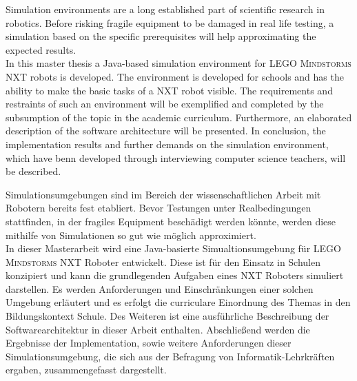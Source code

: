 \documentclass[paper=a4, DIV=calc, BCOR=12mm, twoside=on, onecolumn=on, open = right, titlepage =on, parskip =half-, headsepline = on, footsepline = off, chapterprefix = off, appendixprefix = on, fontsize = 12pt, numbers = noenddot, abstract = on]{scrbook}
\begin{document}
\newpage
\thispagestyle{plain}




\thispagestyle{empty}
\newpage
\thispagestyle{empty}

\onehalfspacing
Simulation environments are a long established part of scientific research in robotics. Before risking fragile equipment to be damaged in real life testing, a simulation based on the specific prerequisites will help approximating the expected results.\\
In this master thesis a Java-based simulation environment for \textsc{LEGO Mindstorms} NXT robots is developed. The environment is developed for schools and has the ability to make the basic tasks of a NXT robot visible. The requirements and restraints of such an environment will be exemplified and completed by the subsumption of the topic in the academic curriculum. Furthermore, an elaborated description of the software architecture will be presented. In conclusion, the implementation results and further demands on the simulation environment, which have benn developed through interviewing computer science teachers, will be described.

\onehalfspacing
Simulationsumgebungen sind im Bereich der wissenschaftlichen Arbeit mit Robotern bereits fest etabliert. Bevor Testungen unter Realbedingungen stattfinden, in der fragiles Equipment beschädigt werden könnte, werden diese mithilfe von Simulationen so gut wie möglich approximiert.\\
In dieser Masterarbeit wird eine Java-basierte Simualtionsumgebung für \textsc{LEGO Mindstorms} NXT Roboter entwickelt. Diese ist für den Einsatz in Schulen konzipiert und kann die grundlegenden Aufgaben eines NXT Roboters simuliert darstellen. Es werden Anforderungen und Einschränkungen einer solchen Umgebung erläutert und es erfolgt die curriculare Einordnung des Themas in den Bildungskontext Schule. Des Weiteren ist eine ausführliche Beschreibung der Softwarearchitektur in dieser Arbeit enthalten. Abschließend werden die Ergebnisse der Implementation, sowie weitere Anforderungen dieser Simulationsumgebung, die sich aus der Befragung von Informatik-Lehrkräften ergaben, zusammengefasst dargestellt.

\singlespacing
\newpage
\listoffigures
\newpage
\tableofcontents
\thispagestyle{empty}
\cleardoublepage
\newpage
{}
\par \singlespacing
\end{document}
